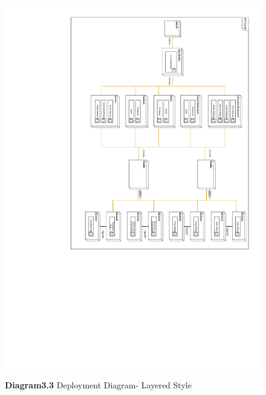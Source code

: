 \documentclass[a4paper]{article}
\begin{document}
	\begin{figure}[H]
		\centering
		\caption*{\textbf{Diagram3.3} Deployment Diagram- Layered Style}
		\includegraphics[width=1\textwidth]{images/DeploymentDiagram_Layered.pdf}
		\label{DD_L}
	\end{figure}
\end{document}
